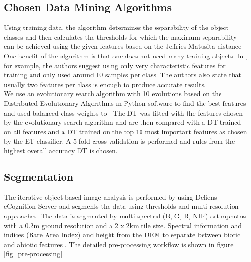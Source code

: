 \documentclass[authoryear, review,12pt,number]{elsarticle}
\begin{document}
\subsection{Chosen Data Mining Algorithms}
Using training data, the algorithm determines the separability of the object 
classes and then
calculates the thresholds for which the maximum separability can be achieved
using the given features based on the Jeffries-Matusita distance 
One benefit of the algorithm is that one does not need many training objects. In
\cite{Nussbaum2006}, for example, the authors suggest using only very
characteristic features for training and only used around 10 samples per
class. The authors also state that usually two features
per class is enough to produce accurate results.\\
We use an evolutionary search 
algorithm with 10 evolutions based on the Distributed Evolutionary Algorithms 
in Python \citep{DEAP_JMLR2012} software to find the best features and used 
balanced class weights to . The 
DT was fitted with the features chosen by the evolutionary search algorithm and
are then compared with a DT trained on all features and 
a DT trained on the top 10 most important features as chosen by the ET 
classifier. A 5 fold cross validation is performed and rules from 
the highest overall accuracy DT is chosen. 

\subsection{Segmentation} 
\label{subsec_segmentation}
The iterative object-based image analysis is performed by \cite{Tintrup2015} 
using Defiens eCognition Server and segments the data using thresholds and 
multi-resolution approaches \citep{baatz2001ecognition}.The data is segmented 
by multi-spectral (B, G, R, NIR) orthophotos with a 0.2m ground resolution and 
a 2 x 2km tile size. Spectral information and indices (Bare Area Index) and 
height from the DEM to separate between biotic and abiotic features 
\citep{Tintrup2015}. The detailed pre-processing workflow is 
shown in figure \ref{fig_pre-processing}.
\end{document}
